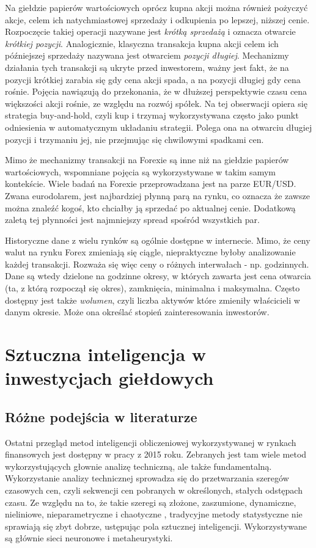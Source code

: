 \documentclass[twoside]{iisthesis}
\begin{document}
Na giełdzie papierów wartościowych oprócz kupna akcji można również pożyczyć akcje, celem ich natychmiastowej sprzedaży i odkupienia po lepszej, niższej cenie. Rozpoczęcie takiej operacji nazywane jest \textit{krótką sprzedażą} i oznacza otwarcie \textit{krótkiej pozycji}. Analogicznie, klasyczna transakcja kupna akcji celem ich późniejszej sprzedaży nazywana jest otwarciem \textit{pozycji długiej}. Mechanizmy działania tych transakcji są ukryte przed inwestorem, ważny jest fakt, że na pozycji krótkiej zarabia się gdy cena akcji spada, a na pozycji długiej gdy cena rośnie. Pojęcia nawiązują do przekonania, że w dłuższej perspektywie czasu cena większości akcji rośnie, ze względu na rozwój spółek. Na tej obserwacji opiera się strategia buy-and-hold, czyli kup i trzymaj wykorzystywana często jako punkt odniesienia w automatycznym układaniu strategii. Polega ona na otwarciu długiej pozycji i trzymaniu jej, nie przejmując się chwilowymi spadkami cen.

Mimo że mechanizmy transakcji na Forexie są inne niż na giełdzie papierów wartościowych, wspomniane pojęcia są wykorzystywane w takim samym kontekście. Wiele badań na Forexie przeprowadzana jest na parze EUR/USD. Zwana eurodolarem, jest najbardziej płynną parą na rynku, co oznacza że zawsze można znaleźć kogoś, kto chciałby ją sprzedać po aktualnej cenie. Dodatkową zaletą tej płynności jest najmniejszy spread spośród wszystkich par.

Historyczne dane z wielu rynków są ogólnie dostępne w internecie. Mimo, że ceny walut na rynku Forex zmieniają się ciągle, niepraktyczne byłoby analizowanie każdej transakcji. Rozważa się więc ceny o różnych interwałach - np. godzinnych. Dane są wtedy dzielone na godzinne okresy, w których zawarta jest cena otwarcia (ta, z którą rozpoczął się okres), zamknięcia, minimalna i maksymalna. Często dostępny jest także \textit{wolumen}, czyli liczba aktywów które zmieniły właścicieli w danym okresie. Może ona określać stopień zainteresowania inwestorów.

\chapter{Sztuczna inteligencja w inwestycjach giełdowych}

\section{Różne podejścia w literaturze}
Ostatni przegląd metod inteligencji obliczeniowej wykorzystywanej w rynkach finansowych jest dostępny w pracy \cite{Cavalcante2016194} z 2015 roku. Zebranych jest tam wiele metod wykorzystujących głownie analizę techniczną, ale także fundamentalną. Wykorzystanie analizy technicznej sprowadza się do przetwarzania szeregów czasowych cen, czyli sekwencji cen pobranych w określonych, stałych odstępach czasu. Ze względu na to, że takie szeregi są złożone, zaszumione, dynamiczne, nieliniowe, nieparametryczne i chaotyczne \cite{Si20132581}, tradycyjne metody statystyczne nie sprawiają się zbyt dobrze, ustępując pola sztucznej inteligencji. Wykorzystywane są głównie sieci neuronowe i metaheurystyki.
\end{document}
